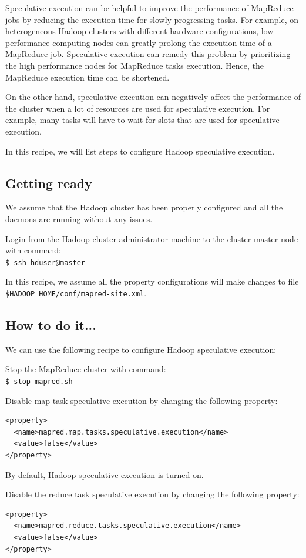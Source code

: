 Speculative execution can be helpful to improve the performance of MapReduce jobs by reducing the execution time for slowly progressing tasks.  For example, on heterogeneous Hadoop clusters with different hardware configurations, low performance computing nodes can greatly prolong the execution time of a MapReduce job. Speculative execution can remedy this problem by prioritizing the high performance nodes for MapReduce tasks execution. Hence, the MapReduce execution time can be shortened.

On the other hand, speculative execution can negatively affect the performance of the cluster when a lot of resources are used for speculative execution. For example, many tasks will have to wait for slots that are used for speculative execution.

In this recipe, we will list steps to configure Hadoop speculative execution.

\subsection*{Getting ready}
We assume that the Hadoop cluster has been properly configured and all the daemons are running without any issues.

Login from the Hadoop cluster administrator machine to the cluster master node with command: \\
\verb|$ ssh hduser@master|

In this recipe, we assume all the property configurations will make changes to file \verb|$HADOOP_HOME/conf/mapred-site.xml|.
\subsection*{How to do it...}
We can use the following recipe to configure Hadoop speculative execution:

Stop the MapReduce cluster with command: \\
\verb|$ stop-mapred.sh|

Disable map task speculative execution by changing the following property:
\lstset{style=bashstyle}
\begin{lstlisting}
<property>
  <name>mapred.map.tasks.speculative.execution</name>
  <value>false</value>
</property>
\end{lstlisting}
By default, Hadoop speculative execution is turned on.


Disable the reduce task speculative execution by changing the following property:
\lstset{style=bashstyle}
\begin{lstlisting}
<property>
  <name>mapred.reduce.tasks.speculative.execution</name>
  <value>false</value>
</property>
\end{lstlisting}


